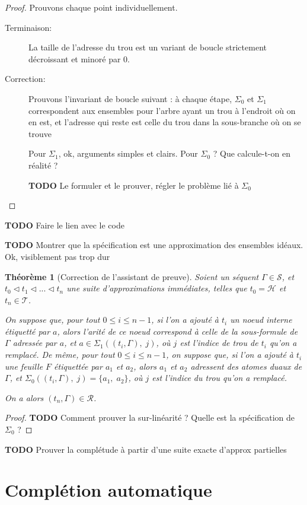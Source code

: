 \documentclass[11pt,a4paper]{article}
\theoremstyle{plain}
\newtheorem{theorem}{Théorème}
\theoremstyle{definition}
\theoremstyle{remark}
\newcommand*{\sequent}{\Gamma}
\newcommand*{\sequents}{\ensuremath{\mathcal{S}}}
\newcommand*{\trees}{\ensuremath{\mathcal{T}}}
\newcommand*{\representations}{\ensuremath{\mathcal{R}}}
\newcommand*{\relapprox}{\ensuremath{\triangleleft}}
\newcommand*{\unknown}{\mathcal{H}}
\newcommand*{\lowapprox}{\ensuremath{\Sigma_0}}
\newcommand*{\highapprox}{\ensuremath{\Sigma_1}}
\newcommand*{\todo}{{\normalfont \textbf{TODO}} }
\begin{document}
\begin{proof}
    Prouvons chaque point individuellement.
    \begin{description}
        \item[Terminaison:] La taille de l'adresse du trou est un variant de boucle strictement décroissant et minoré par 0.

        \item[Correction:] Prouvons l'invariant de boucle suivant : \og à chaque étape, $\lowapprox$ et $\highapprox$ correspondent aux ensembles pour l'arbre ayant un trou à l'endroit où on en est, et l'adresse qui reste est celle du trou dans la sous-branche où on se trouve \fg

        Pour $\highapprox$, ok, arguments simples et clairs. Pour $\lowapprox$ ? Que calcule-t-on en réalité ?

        \todo{Le formuler et le prouver, régler le problème lié à $\lowapprox$}
    \end{description}
\end{proof}

\todo{Faire le lien avec le code}

\todo{Montrer que la spécification est une approximation des ensembles idéaux. Ok, visiblement pas trop dur}

\begin{theorem}[Correction de l'assistant de preuve]
    Soient un séquent $\sequent \in \sequents$, et $t_0 \relapprox t_1 \relapprox ... \relapprox t_n$ une suite d'approximations immédiates, telles que $t_0 = \unknown$ et $t_n \in \trees$.
    
    On suppose que, pour tout $0 \leq i \leq n-1$, si l'on a ajouté à $t_i$ un noeud interne étiquetté par $a$, alors l'arité de ce noeud correspond à celle de la sous-formule de $\sequent$ adressée par $a$, et $a \in \highapprox((t_i, \sequent), \; j)$, où $j$ est l'indice de trou de $t_i$ qu'on a remplacé. De même, pour tout $0 \leq i \leq n-1$, on suppose que, si l'on a ajouté à $t_i$ une feuille $F$ étiquettée par $a_1$ et $a_2$, alors $a_1$ et $a_2$ adressent des atomes duaux de $\sequent$, et $\lowapprox((t_i, \sequent), \; j) = \{a_1, \; a_2\}$, où $j$ est l'indice du trou qu'on a remplacé.

    On a alors $(t_n, \sequent) \in \representations$.
\end{theorem}

\begin{proof}
    \todo{Comment prouver la sur-linéarité ? Quelle est la spécification de $\lowapprox$ ?}
\end{proof}

\todo{Prouver la complétude à partir d'une suite exacte d'approx partielles}

\section{Complétion automatique}
\end{document}
